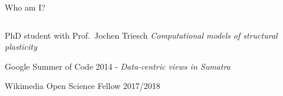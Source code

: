 
\begin{frame}{Who am I?}
  \begin{columns}
    \begin{column}{.625\textwidth}
      \minipage[c][0.625\textheight][s]{\columnwidth}

      PhD student with Prof.~Jochen Triesch \textit{Computational models of structural plasticity}

      \vfill

      Google Summer of Code 2014 - \textit{Data-centric views in Sumatra}

      \vfill

      Wikimedia Open Science Fellow 2017/2018
      
      \endminipage      
    \end{column}
    \begin{column}{.249\textwidth}
      
      
    \end{column}
  \end{columns}
\end{frame}

